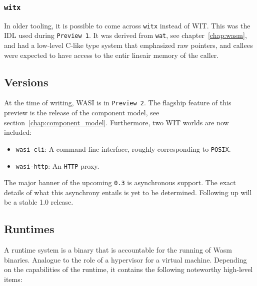\subsubsection{\texttt{witx}}

In older tooling, it is possible to come across \texttt{witx} instead of \gls{WIT}. This was the \gls{IDL} used during \texttt{Preview 1}. It was derived from \texttt{wat}, see chapter~\ref{chap:wasm}, and had a low-level C-like type system that emphasized raw pointers, and callees were expected to have access to the entir lineair memory of the caller.

\subsection{Versions}
\label{sec:versions}
At the time of writing, \gls{WASI} is in \texttt{Preview 2}. The flagship feature of this preview is the release of the component model, see section~\ref{chap:component_model}. Furthermore, two \gls{WIT} worlds are now included:

\begin{itemize}
    \item \texttt{wasi-cli}: A command-line interface, roughly corresponding to \texttt{POSIX}.
    \item \texttt{wasi-http}: An \texttt{HTTP} proxy.
\end{itemize}

The major banner of the upcoming \texttt{0.3} is asynchronous support. The exact details of what this asynchrony entails is yet to be determined. Following up will be a stable 1.0 release.

\subsection{Runtimes}
\label{sec:runtimes}

A runtime system is a binary that is accountable for the running of \gls{Wasm} binaries. Analogue to the role of a hypervisor for a virtual machine. Depending on the capabilities of the runtime, it contains the following noteworthy high-level items:

